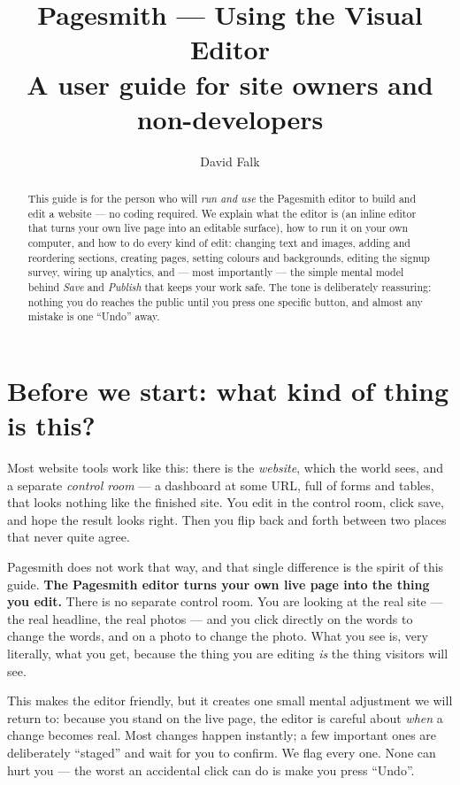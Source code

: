 \documentclass[11pt]{article}
\title{\bfseries Pagesmith — Using the Visual Editor\\[2pt]
\large A user guide for site owners and non-developers}
\author{David Falk}
\date{}
\begin{document}
\maketitle

\begin{abstract}
This guide is for the person who will \emph{run and use} the Pagesmith editor to
build and edit a website --- no coding required. We explain what the editor is
(an inline editor that turns your own live page into an editable surface), how to
run it on your own computer, and how to do every kind of edit: changing text and
images, adding and reordering sections, creating pages, setting colours and
backgrounds, editing the signup survey, wiring up analytics, and --- most
importantly --- the simple mental model behind \emph{Save} and \emph{Publish} that
keeps your work safe. The tone is deliberately reassuring: nothing you do reaches
the public until you press one specific button, and almost any mistake is one
``Undo'' away.
\end{abstract}

\tableofcontents
\bigskip

\section{Before we start: what kind of thing is this?}

Most website tools work like this: there is the \emph{website}, which the world
sees, and a separate \emph{control room} --- a dashboard at some  URL,
full of forms and tables, that looks nothing like the finished site. You edit in the
control room, click save, and hope the result looks right. Then you flip back and
forth between two places that never quite agree.

Pagesmith does not work that way, and that single difference is the spirit of this
guide. \textbf{The Pagesmith editor turns your own live page into the thing you
edit.} There is no separate control room. You are looking at the real site --- the
real headline, the real photos --- and you click directly on the words to change the
words, and on a photo to change the photo. What you see is, very literally, what you
get, because the thing you are editing \emph{is} the thing visitors will see.

This makes the editor friendly, but it creates one small mental adjustment we will
return to: because you stand on the live page, the editor is careful about
\emph{when} a change becomes real. Most changes happen instantly; a few important
ones are deliberately ``staged'' and wait for you to confirm. We flag every one. None
can hurt you --- the worst an accidental click can do is make you press ``Undo''.
\end{document}
